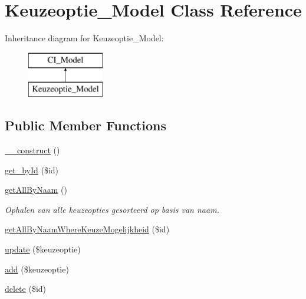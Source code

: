 \hypertarget{class_keuzeoptie___model}{}\section{Keuzeoptie\+\_\+\+Model Class Reference}
\label{class_keuzeoptie___model}
Inheritance diagram for Keuzeoptie\+\_\+\+Model\+:\begin{figure}[H]
\begin{center}
\leavevmode
\includegraphics[height=2.000000cm]{class_keuzeoptie___model}
\end{center}
\end{figure}
\subsection*{Public Member Functions}
\begin{DoxyCompactItemize}
\item 
\mbox{\hyperlink{class_keuzeoptie___model_a095c5d389db211932136b53f25f39685}{\+\_\+\+\_\+construct}} ()
\item 
\mbox{\hyperlink{class_keuzeoptie___model_a98d28a4d9a29d40c5a8aa0176f19a919}{get\+\_\+by\+Id}} (\$id)
\item 
\mbox{\hyperlink{class_keuzeoptie___model_a2b035b1ffd1cbe651b35bb3e53d72c09}{get\+All\+By\+Naam}} ()
\begin{DoxyCompactList}\small\item\em Ophalen van alle keuzeopties gesorteerd op basis van naam. \end{DoxyCompactList}\item 
\mbox{\hyperlink{class_keuzeoptie___model_a6f3e4d26ab480501524eabb01683f5f7}{get\+All\+By\+Naam\+Where\+Keuze\+Mogelijkheid}} (\$id)
\item 
\mbox{\hyperlink{class_keuzeoptie___model_a9d98d1a6c3919a0e7b946d37fa385948}{update}} (\$keuzeoptie)
\item 
\mbox{\hyperlink{class_keuzeoptie___model_a2452f524e794bc3f418d60cb296e19b5}{add}} (\$keuzeoptie)
\item 
\mbox{\hyperlink{class_keuzeoptie___model_a2f8258add505482d7f00ea26493a5723}{delete}} (\$id)
\end{DoxyCompactItemize}



